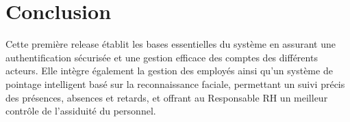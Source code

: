 \section{Conclusion}

Cette première release établit les bases essentielles du système en assurant une authentification sécurisée et une gestion efficace des comptes des différents acteurs. Elle intègre également la gestion des employés ainsi qu'un système de pointage intelligent basé sur la reconnaissance faciale, permettant un suivi précis des présences, absences et retards, et offrant au Responsable RH un meilleur contrôle de l'assiduité du personnel.